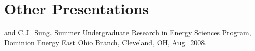 \section{{\sectionfont Other Presentations}}

\begin{bibmune}
\item {} and C.J.\ Sung.  Summer Undergraduate Research in Energy Sciences Program,
        Dominion Energy East Ohio Branch, Cleveland, OH, Aug.\ 2008.\\
\end{bibmune}

\vspace{0.1in}

